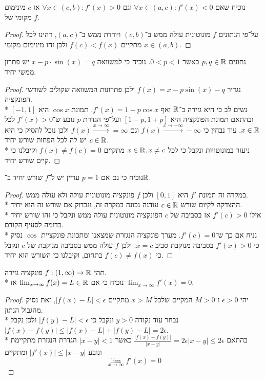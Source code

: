 \Subquestion{}
נוכיח שאם $\forall x \in (a, c) : f'(x) < 0$ וגם $\forall x \in (c, b) : f'(x) > 0$ אז $c$ מינימום מקומי של $f$.
\begin{proof}
	על־פי הנתונים $f$ מונוטונית עולה ממש ב־$(c, b)$ ויורדת ממש ב־$(a, c)$, דהינו לכל $x \in (a, b)$ מתקיים $f(c) < f(x)$ ולכן זהו מינימום מקומי.
\end{proof}

\Question{}
\Subquestion{}
נתונים $p, q \in \mathbb{R}$ כאשר $0 < p < 1$. נוכיח כי למשוואה $x - p \cdot \sin(x) = q$ יש פתרון ממשי יחיד.
\begin{proof}
	נגדיר $f(x) = x - p \sin(x) - q$ ולכן פתרונות המשוואה שקולים לשורשי הפונקציה. \\*
	נשים לב כי היא גזירה ב־$\mathbb{R}$ ואף $f'(x) = 1 - p \cos x$. תמונת $\cos x$ היא $[-1, 1]$ ובהתאם תמונת הפונקציה היא $[1 - p, 1 + p]$ ועל־פי הגדרת $p$ נובע ש־$f'(x) > 0$ לכל $x \in \mathbb{R}$.
	עוד נבחין כי $f(x) \xrightarrow{x \to -\infty} -\infty$ וגם $f(x) \xrightarrow{x \to \infty} = \infty$ ולכן נוכל להסיק כי היא יש לה לכל הפחות שורש יחיד $c \in \mathbb{R}$. \\*
	ניעזר במונוטויות ונקבל כי לכל $x \in \mathbb{R}, x \ne c$ מתקיים $f(x) \ne f(c) = 0$ וקיבלנו כי קיים שורש יחיד.
\end{proof}

\Subquestion{}
נוכיח כי גם אם $p = 1$ עדיין יש ל־$f$ שורש יחיד ב־$\mathbb{R}$.
\begin{proof}
	במקרה זה תמונת $f'$ היא $[0, 1]$ ולכן $f$ פונקציה מונוטונית עולה ולא עולה ממש. \\*
	ההצדקה לקיום שורש $c \in \mathbb{R}$ עודנה נכונה במקרה זה, ונבדוק אם שורש זה הוא יחיד. \\*
	אילו $f'(c) > 0$ אז בסביבה של $c$ הפונקציה מונוטונית עולה ממש ונקבל כי זהו שורש יחיד בדומה לסעיף הקודם. \\*
	נניח אם כך ש־$f'(c) = 0$. מערך פונקציה הנגזרת שמצאנו ומתכונת פונקציית $\cos$ נסיק כי $f'(x) > 0$ בסביבה מנוקבת סביב $x = c$.
	ולכן $f$ עולה ממש בסביבה מנוקבת של $c$ ונקבל כי $f(c) \ne f(x)$ בתחום, וקיבלנו כי השורש הוא יחיד.
\end{proof}

\Question{}
תהי $f : (1, \infty) \to \mathbb{R}$ פונקציה גזירה. \\*
נוכיח כי אם $\lim_{x \to \infty} f(x) = L \in \mathbb{R}$ אז $\lim_{x \to \infty} f'(x) = 0$.
\begin{proof}
	יהי $\epsilon > 0$ ו־$M > 0$ המקיים שלכל $x > M$ מתקיים $|f(x) - L| < \epsilon$, זאת נסיק מהגבול הנתון. \\*
	נבחר עוד נקודה $y > 0$ ונקבל כי $|f(y) - L| < \epsilon$ ולכן נקבל $|f(x) - f(y)| \le |f(x) - L| + |f(y) - L| = 2\epsilon$. \\*
	בהתאם $\frac{|f(x) - f(y)|}{|x - y|} = 2\epsilon |x - y| \le 2 \epsilon$ כאשר $|x - y| < 1$ הגדרת הנגזרת מתקיימת ונובע $|f'(x)| \le |x - y|$ ומתקיים
	\[
		\lim_{x \to \infty} f'(x) = 0
	\]
\end{proof}

